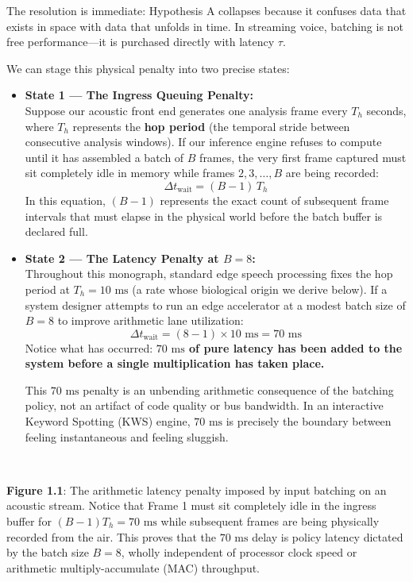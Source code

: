 \documentclass[11pt,a4paper]{article}
\renewcommand{\thefigure}{1.1\alph{figure}}
\begin{document}
The resolution is immediate: Hypothesis A collapses because it confuses data that exists in space with data that unfolds in time. In streaming voice, batching is not free performance---it is purchased directly with latency $\tau$.

We can stage this physical penalty into two precise states:

\begin{itemize}\setlength{\itemsep}{2pt}\setlength{\parskip}{0pt}
    \item \textbf{State 1 --- The Ingress Queuing Penalty:}\\
    Suppose our acoustic front end generates one analysis frame every $T_h$ seconds, where $T_h$ represents the \textbf{hop period} (the temporal stride between consecutive analysis windows). If our inference engine refuses to compute until it has assembled a batch of $B$ frames, the very first frame captured must sit completely idle in memory while frames $2, 3, \dots, B$ are being recorded:
    \[
    \Delta t_{\text{wait}} = (B - 1) \, T_h
    \]
    In this equation, $(B-1)$ represents the exact count of subsequent frame intervals that must elapse in the physical world before the batch buffer is declared full.

    \item \textbf{State 2 --- The Latency Penalty at $B = 8$:}\\
    Throughout this monograph, standard edge speech processing fixes the hop period at $T_h = 10\text{ ms}$ (a rate whose biological origin we derive below). If a system designer attempts to run an edge accelerator at a modest batch size of $B = 8$ to improve arithmetic lane utilization:
    \[
    \Delta t_{\text{wait}} = (8 - 1) \times 10\text{ ms} = 70\text{ ms}
    \]
    Notice what has occurred: \textbf{$70\text{ ms}$ of pure latency has been added to the system before a single multiplication has taken place.}
    
    This $70\text{ ms}$ penalty is an unbending arithmetic consequence of the batching policy, not an artifact of code quality or bus bandwidth. In an interactive Keyword Spotting (KWS) engine, $70\text{ ms}$ is precisely the boundary between feeling instantaneous and feeling sluggish.
\end{itemize}

\begin{center}
\begin{minipage}{\textwidth}
\centering
\\[2mm]
\label{fig:1_1b_batch_tax}
\begin{minipage}{0.95\textwidth}
\small\textbf{Figure \thefigure}: The arithmetic latency penalty imposed by input batching on an acoustic stream. Notice that Frame 1 must sit completely idle in the ingress buffer for $(B-1)T_h = 70\text{ ms}$ while subsequent frames are being physically recorded from the air. This proves that the $70\text{ ms}$ delay is policy latency dictated by the batch size $B=8$, wholly independent of processor clock speed or arithmetic multiply-accumulate (MAC) throughput.
\end{minipage}
\end{minipage}
\end{center}
\end{document}
